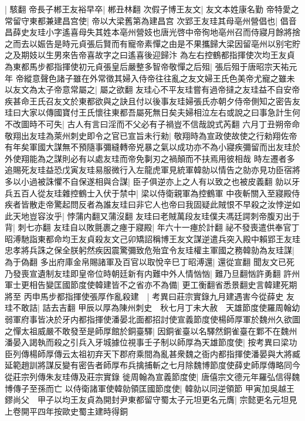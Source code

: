 |{
	駭翻}
帝長子郴王友裕早卒|{
	郴丑林翻}
次假子博王友文|{
	友文本姓康名勤}
帝特愛之常留守東都兼建昌宫使|{
	帝以大梁舊第為建昌宫}
次郢王友珪其母亳州營倡也|{
	倡音昌薛史友珪小字遙喜母失其姓本亳州營妓也唐光啓中帝徇地亳州召而侍寢月餘將捨之而去以娠告是時元貞張后賢而有寵帝素憚之由是不果攜歸大梁因留亳州以别宅貯之及期妓以生男來告帝喜故字之曰遙喜後迎歸汴}
為左右控鶴都指揮使次均王友貞為東都馬步都指揮使初元貞張皇后嚴整多智帝敬憚之后殂|{
	張后殂于唐昭宗天祐元年}
帝縱意聲色諸子雖在外常徵其婦入侍帝往往亂之友文婦王氏色美帝尤寵之雖未以友文為太子帝意常屬之|{
	屬之欲翻}
友珪心不平友珪嘗有過帝撻之友珪益不自安帝疾甚命王氏召友文於東都欲與之訣且付以後事友珪婦張氏亦朝夕侍帝側知之密告友珪曰大家以傳國寶付王氏懷往東都吾屬死無日矣夫婦相泣左右或說之曰事急計生何不改圖時不可失|{
	古人有言曰淫而不父必有子禍豈不信哉說式芮翻}
六月丁丑朔帝命敬翔出友珪為萊州刺史即令之官已宣旨未行勑|{
	敬翔時為宣政使故使之行勑翔佐帝有年矣軍國大謀無不預隨事彌縫轉帝兇暴之氣以成功亦不為小寢疾彌留而出友珪於外使翔能為之謀則必有以處友珪而帝免剚刃之禍顛而不扶焉用彼相哉}
時左遷者多追賜死友珪益恐戊寅友珪易服微行入左龍虎軍見統軍韓勍以情告之勍亦見功臣宿將多以小過被誅懼不自保遂相與合謀|{
	臣子俱逆亦上之人有以致之也被皮義翻}
勍以牙兵五百人從友珪雜控鶴士入伏于禁中|{
	梁以侍衛親軍為控鶴軍}
中夜斬關入至寢殿侍疾者皆散走帝驚起問反者為誰友珪曰非它人也帝曰我固疑此賊恨不早殺之汝悖逆如此天地豈容汝乎|{
	悖蒲内翻又蒲沒翻}
友珪曰老賊萬段友珪僕夫馮廷諤刺帝腹刃出于背|{
	刺七亦翻}
友珪自以敗氈裹之瘞于寢殿|{
	年六十一瘞於計翻}
祕不發喪遣供奉官丁昭溥馳詣東都命均王友貞殺友文己卯矯詔稱博王友文謀逆遣兵突入殿中賴郢王友珪忠孝將兵誅之保全朕躬然疾因震驚彌致危殆宜令友珪權主軍國之務韓勍為友珪謀|{
	為于偽翻}
多出府庫金帛賜諸軍及百官以取悅辛巳丁昭溥還|{
	還從宣翻}
聞友文已死乃發喪宣遺制友珪即皇帝位時朝廷新有内難中外人情忷忷|{
	難乃旦翻忷許勇翻}
許州軍士更相告變匡國節度使韓建皆不之省亦不為備|{
	更工衡翻省悉景翻史言韓建死期將至}
丙申馬步都指揮使張厚作亂殺建　|{
	考異曰莊宗實錄九月建遇害今從薛史}
友珪不敢詰|{
	詰去吉翻}
甲辰以厚為陳州刺史　秋七月丁未大赦　天雄節度使羅周翰幼弱軍府事皆决於牙内都指揮使潘晏北面都招討使宣義節度使楊師厚軍於魏州久欲圖之憚太祖威嚴不敢發至是師厚館於銅臺驛|{
	因銅雀臺以名驛然銅雀臺在鄴不在魏州}
潘晏入謁執而殺之引兵入牙城據位視事壬子制以師厚為天雄節度使|{
	按考異曰梁功臣列傳楊師厚傳云太祖初弃天下郡府乘間為亂甚衆魏之衙内都指揮使潘晏與大將臧延範趙訓將謀反變有密告者師厚布兵擒捕斬之七月除魏博節度使薛史師厚傳略同今從莊宗列傳朱友珪傳及莊宗實錄}
徙周翰為宣義節度使|{
	唐僖宗文德元年羅弘信得魏博傳子至孫而亡}
以侍衛諸軍使韓勍領匡國節度使|{
	韓勍以同逆領節}
甲寅加吳越王鏐尚父　甲子以均王友貞為開封尹東都留守蜀太子元坦更名元膺|{
	宗懿更名元坦見上卷開平四年按歐史蜀主建時得銅}


